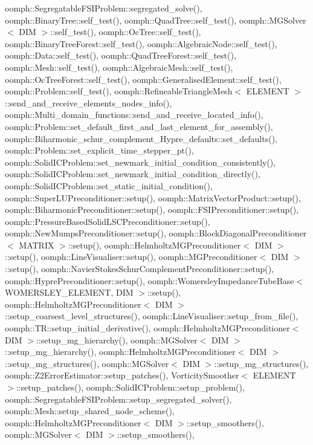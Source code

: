 oomph\+::\+Segregatable\+F\+S\+I\+Problem\+::segregated\+\_\+solve(), oomph\+::\+Binary\+Tree\+::self\+\_\+test(), oomph\+::\+Quad\+Tree\+::self\+\_\+test(), oomph\+::\+M\+G\+Solver$<$ D\+I\+M $>$\+::self\+\_\+test(), oomph\+::\+Oc\+Tree\+::self\+\_\+test(), oomph\+::\+Binary\+Tree\+Forest\+::self\+\_\+test(), oomph\+::\+Algebraic\+Node\+::self\+\_\+test(), oomph\+::\+Data\+::self\+\_\+test(), oomph\+::\+Quad\+Tree\+Forest\+::self\+\_\+test(), oomph\+::\+Mesh\+::self\+\_\+test(), oomph\+::\+Algebraic\+Mesh\+::self\+\_\+test(), oomph\+::\+Oc\+Tree\+Forest\+::self\+\_\+test(), oomph\+::\+Generalised\+Element\+::self\+\_\+test(), oomph\+::\+Problem\+::self\+\_\+test(), oomph\+::\+Refineable\+Triangle\+Mesh$<$ E\+L\+E\+M\+E\+N\+T $>$\+::send\+\_\+and\+\_\+receive\+\_\+elements\+\_\+nodes\+\_\+info(), oomph\+::\+Multi\+\_\+domain\+\_\+functions\+::send\+\_\+and\+\_\+receive\+\_\+located\+\_\+info(), oomph\+::\+Problem\+::set\+\_\+default\+\_\+first\+\_\+and\+\_\+last\+\_\+element\+\_\+for\+\_\+assembly(), oomph\+::\+Biharmonic\+\_\+schur\+\_\+complement\+\_\+\+Hypre\+\_\+defaults\+::set\+\_\+defaults(), oomph\+::\+Problem\+::set\+\_\+explicit\+\_\+time\+\_\+stepper\+\_\+pt(), oomph\+::\+Solid\+I\+C\+Problem\+::set\+\_\+newmark\+\_\+initial\+\_\+condition\+\_\+consistently(), oomph\+::\+Solid\+I\+C\+Problem\+::set\+\_\+newmark\+\_\+initial\+\_\+condition\+\_\+directly(), oomph\+::\+Solid\+I\+C\+Problem\+::set\+\_\+static\+\_\+initial\+\_\+condition(), oomph\+::\+Super\+L\+U\+Preconditioner\+::setup(), oomph\+::\+Matrix\+Vector\+Product\+::setup(), oomph\+::\+Biharmonic\+Preconditioner\+::setup(), oomph\+::\+F\+S\+I\+Preconditioner\+::setup(), oomph\+::\+Pressure\+Based\+Solid\+L\+S\+C\+Preconditioner\+::setup(), oomph\+::\+New\+Mumps\+Preconditioner\+::setup(), oomph\+::\+Block\+Diagonal\+Preconditioner$<$ M\+A\+T\+R\+I\+X $>$\+::setup(), oomph\+::\+Helmholtz\+M\+G\+Preconditioner$<$ D\+I\+M $>$\+::setup(), oomph\+::\+Line\+Visualiser\+::setup(), oomph\+::\+M\+G\+Preconditioner$<$ D\+I\+M $>$\+::setup(), oomph\+::\+Navier\+Stokes\+Schur\+Complement\+Preconditioner\+::setup(), oomph\+::\+Hypre\+Preconditioner\+::setup(), oomph\+::\+Womersley\+Impedance\+Tube\+Base$<$ W\+O\+M\+E\+R\+S\+L\+E\+Y\+\_\+\+E\+L\+E\+M\+E\+N\+T, D\+I\+M $>$\+::setup(), oomph\+::\+Helmholtz\+M\+G\+Preconditioner$<$ D\+I\+M $>$\+::setup\+\_\+coarsest\+\_\+level\+\_\+structures(), oomph\+::\+Line\+Visualiser\+::setup\+\_\+from\+\_\+file(), oomph\+::\+T\+R\+::setup\+\_\+initial\+\_\+derivative(), oomph\+::\+Helmholtz\+M\+G\+Preconditioner$<$ D\+I\+M $>$\+::setup\+\_\+mg\+\_\+hierarchy(), oomph\+::\+M\+G\+Solver$<$ D\+I\+M $>$\+::setup\+\_\+mg\+\_\+hierarchy(), oomph\+::\+Helmholtz\+M\+G\+Preconditioner$<$ D\+I\+M $>$\+::setup\+\_\+mg\+\_\+structures(), oomph\+::\+M\+G\+Solver$<$ D\+I\+M $>$\+::setup\+\_\+mg\+\_\+structures(), oomph\+::\+Z2\+Error\+Estimator\+::setup\+\_\+patches(), Vorticity\+Smoother$<$ E\+L\+E\+M\+E\+N\+T $>$\+::setup\+\_\+patches(), oomph\+::\+Solid\+I\+C\+Problem\+::setup\+\_\+problem(), oomph\+::\+Segregatable\+F\+S\+I\+Problem\+::setup\+\_\+segregated\+\_\+solver(), oomph\+::\+Mesh\+::setup\+\_\+shared\+\_\+node\+\_\+scheme(), oomph\+::\+Helmholtz\+M\+G\+Preconditioner$<$ D\+I\+M $>$\+::setup\+\_\+smoothers(), oomph\+::\+M\+G\+Solver$<$ D\+I\+M $>$\+::setup\+\_\+smoothers(), 